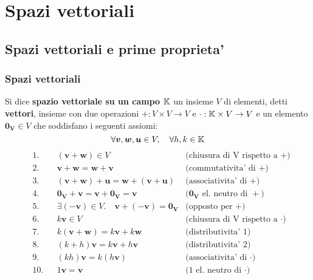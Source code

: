 \chapter{Spazi vettoriali}

\section{Spazi vettoriali e prime proprieta'}

\subsection{Spazi vettoriali}
\begin{definition}
    Si dice \textbf{spazio vettoriale su un campo $\mathbb{K}$} un insieme $V$ di elementi, detti \textbf{vettori}, insieme con due operazioni $+ : V \times V \to V$ e $\cdot : \mathbb{K} \times V \to V$ e un elemento $\bm{0_V} \in V$ che soddisfano i seguenti assiomi:
    \[\forall \bm{v}, \bm{w}, \bm{u} \in V, \quad\forall h, k \in \mathbb{K} \]
    \begin{align}
        &\text{1.} &&(\bm{v} + \bm{w}) \in V                                        &\text{(chiusura di V rispetto a $+$)} \\      
        &\text{2.} &&\bm{v} + \bm{w} = \bm{w} + \bm{v}                              &\text{(commutativita' di $+$)} \\
        &\text{3.} &&(\bm{v} + \bm{w}) + \bm{u} = \bm{w} + (\bm{v} + \bm{u})        &\text{(associativita' di $+$)} \\
        &\text{4.} &&\bm{0_V} + \bm{v} = \bm{v} + \bm{0_V} = \bm{v}                 &\text{($\bm{0_V}$ el. neutro di $+$)} \\
        &\text{5.} &&\exists (-\bm{v}) \in V. \quad\bm{v} + (\bm{-v}) = \bm{0_V}    &\text{(opposto per $+$)} \\
        &\text{6.} &&k\bm{v} \in V                                                  &\text{(chiusura di V rispetto a $\cdot$)} \\
        &\text{7.} &&k(\bm{v} + \bm{w}) = k\bm{v} + k\bm{w}                         &\text{(distributivita' 1)} \\
        &\text{8.} &&(k + h)\bm{v}= k\bm{v} + h\bm{v}                               &\text{(distributivita' 2)} \\
        &\text{9.} &&(kh)\bm{v}= k(h\bm{v})                                         &\text{(associativita' di $\cdot$)} \\
        &\text{10.}&&1\bm{v}= \bm{v}                                                &\text{(1 el. neutro di $\cdot$)}
    \end{align}
\end{definition}
 
